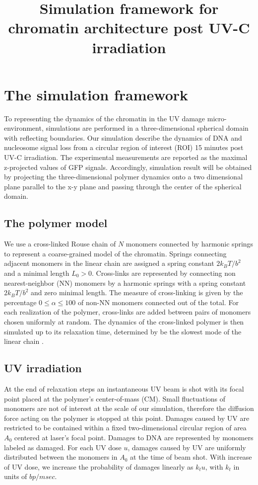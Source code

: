 \documentclass[12pt]{article}
\begin{document}
	
	\title{Simulation framework for chromatin architecture post UV-C irradiation}
\maketitle
\section{The simulation framework}
	To representing the dynamics of the chromatin in the UV damage micro-environment, simulations are performed in a three-dimensional spherical domain with reflecting boundaries. Our simulation describe the dynamics of DNA and nucleosome signal loss from a circular region of interest (ROI) 15 minutes post UV-C irradiation. The experimental measurements are reported as the maximal z-projected values of GFP signals. Accordingly, simulation result will be obtained by projecting the three-dimensional polymer dynamics onto a two dimensional plane parallel to the x-y plane and passing through the center of the spherical domain. 
	
	\subsection{The polymer model}
	We use a cross-linked Rouse chain of $N$ monomers \cite{doi1988theory} connected by harmonic springs to represent a coarse-grained model of the chromatin. Springs connecting adjacent monomers in the linear chain are assigned a spring constant $2k_BT/b^2$ and a minimal length $L_0>0$. Cross-links are represented by connecting non nearest-neighbor (NN) monomers by a harmonic springs with a spring constant $2k_BT/b^2$ and zero minimal length. The measure of cross-linking is given by the percentage $0\leq \alpha\leq 100$ of non-NN monomers connected out of the total. For each realization of the polymer, cross-links are added between pairs of monomers chosen uniformly at random. The dynamics of the cross-linked polymer is then simulated up to its relaxation time, determined by be the slowest mode of the linear chain \cite{doi1988theory}.
	
	\subsection{UV irradiation}
	At the end of relaxation steps an instantaneous UV beam is shot with its focal point placed at the polymer's center-of-mass (CM). Small fluctuations of monomers are not of interest at the scale of our simulation, therefore the diffusion force acting on the polymer is stopped at this point. Damages caused by UV are restricted to be contained within a fixed two-dimensional circular region of area $A_0$ centered at laser's focal point. Damages to DNA are represented by monomers labeled as damaged. For each UV dose $u$, damages caused by UV are uniformly distributed between the monomers in $A_0$ at the time of beam shot. With increase of UV dose, we increase the probability of damages linearly as $k_tu$, with $k_t$ in units of $bp/msec$. 
	
\end{document}
